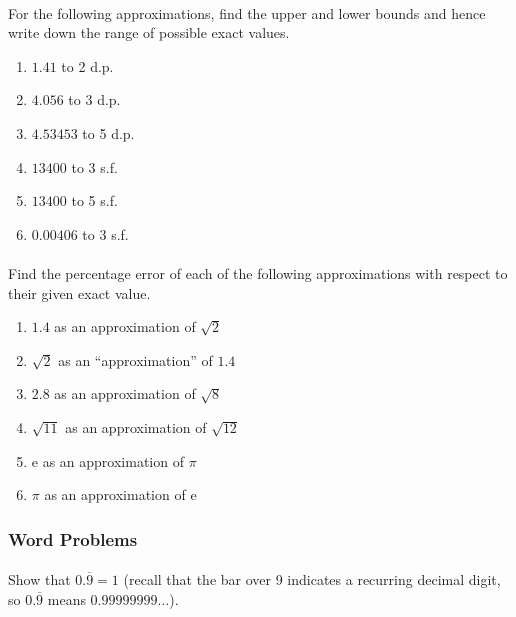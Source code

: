 \documentclass[12pt, a4paper, titlepage, twoside]{article}
\newcommand*{\e}{\textrm{e}}
\begin{document}
	\paragraph{}
	 For the following approximations, find the upper and lower bounds and hence write down the
	range of possible exact values.
	
	\begin{multicols}{2}
		\begin{enumerate}[label=\textbf{(\alph*)}]
			\item $1.41$ to 2 d.p.
			\item $4.056$ to 3 d.p.
			\item $4.53453$ to 5 d.p.
			\item $13400$ to 3 s.f.
			\item $13400$ to 5 s.f.
			\item $0.00406$ to 3 s.f.
		\end{enumerate}
	\end{multicols}
	
	\paragraph{}
	 Find the percentage error of each of the following approximations with respect to their given exact value.
	
	\begin{multicols}{2}
		\begin{enumerate}[label=\textbf{(\alph*)}]
			\item $1.4$ as an approximation of $\sqrt{2}$
			\item $\sqrt{2}$ as an ``approximation'' of $1.4$
			\item $2.8$ as an approximation of $\sqrt{8}$
			\item $\sqrt{11}$ as an approximation of $\sqrt{12}$
			\item $\e$ as an approximation of $\pi$
			\item $\pi$ as an approximation of $\e$
		\end{enumerate}
	\end{multicols}
	
	\subsubsection*{Word Problems}
	
	\paragraph{}
	 Show that $0.\overline{9}= 1$ (recall that the bar over 9 indicates a recurring decimal digit, so
	$0.\overline{9}$ means $0.99999999...$).
	
\end{document}
